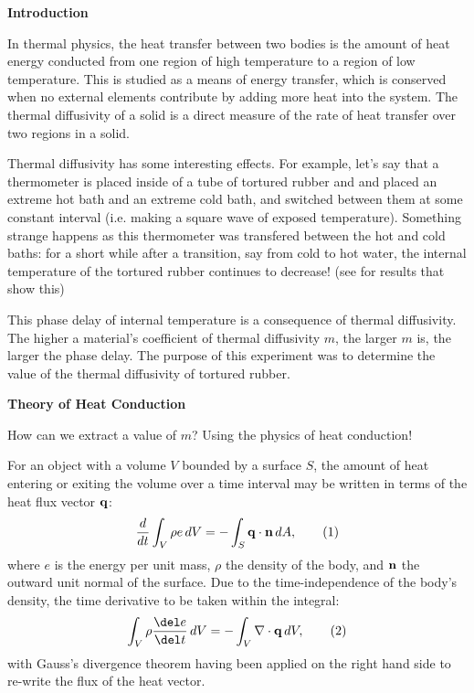 \documentclass[11pt]{article}
\begin{document}
\begin{multicols}{2}


     \selectfont \textbf{Introduction}
    
     \selectfont 
    
    In thermal physics, the heat transfer between two bodies is the amount of heat energy conducted from one region of high temperature to a region of low temperature. This is studied as a means of energy transfer, which is conserved when no external elements contribute by adding more heat into the system. The thermal diffusivity of a solid is a direct measure of the rate of heat transfer over two regions in a solid.

    Thermal diffusivity has some interesting effects. For example, let's say that a thermometer is placed inside of a tube of tortured rubber and and placed an extreme hot bath and an extreme cold bath, and switched between them at some constant interval (i.e. making a square wave of exposed temperature). Something strange happens as this thermometer was transfered between the hot and cold baths: for a short while after a transition, say from cold to hot water, the internal temperature of the tortured rubber continues to decrease! (see \label{temperatureGraph} for results that show this)
    
    This phase delay of internal temperature is a consequence of thermal diffusivity. The higher a material's coefficient of thermal diffusivity $m$, the larger $m$ is, the larger the phase delay. The purpose of this experiment was to determine the value of the thermal diffusivity of tortured rubber. 


    \vspace{10pt}

     \selectfont \textbf{Theory of Heat Conduction}
    
     \selectfont 

    How can we extract a value of $m$? Using the physics of heat conduction!
     

    For an object with a volume $V$ bounded by a surface $S$, the amount of heat entering or exiting the volume over a time interval may be written in terms of the heat flux vector ${\bf{q}}$:
    \[
        \frac{d}{dt}\int_V \rho e\, dV = -\int_S {\bf{q}}\cdot {\bf{n}}\, dA,  \tag{1} 
    \]
    \nd where $e$ is the energy per unit mass, $\rho$ the density of the body, and ${\bf{n}}$ the outward unit normal of the surface. Due to the time-independence of the body's density, the time derivative to be taken within the integral: 
    \[
        \int_V \rho \frac{\del e}{\del t}\, dV = -\int_V\nabla\cdot {\bf{q}}\, dV,  \tag{2}
    \]
    \nd with Gauss's divergence theorem having been applied on the right hand side to re-write the flux of the heat vector.


\end{multicols}
\end{document}
